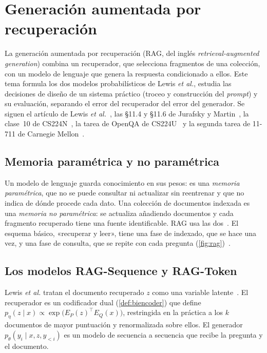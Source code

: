 \chapter{Generación aumentada por recuperación}
\label{tema:5}

La generación aumentada por recuperación (RAG, del inglés \emph{retrieval-augmented generation}) combina un recuperador, que selecciona fragmentos de una colección, con un modelo de lenguaje que genera la respuesta condicionado a ellos. Este tema formula los dos modelos probabilísticos de Lewis \emph{et al.}, estudia las decisiones de diseño de un sistema práctico (troceo y construcción del \emph{prompt}) y su evaluación, separando el error del recuperador del error del generador. Se siguen el artículo de Lewis \emph{et al.}~\cite{rag}, las §11.4 y §11.6 de Jurafsky y Martin~\cite{jm3}, la clase~10 de CS224N~\cite{cs224n}, la tarea de OpenQA de CS224U~\cite{cs224u} y la segunda tarea de 11-711 de Carnegie Mellon~\cite{cmu711}.

\section{Memoria paramétrica y no paramétrica}

Un modelo de lenguaje guarda conocimiento en sus pesos: es una \emph{memoria paramétrica}, que no se puede consultar ni actualizar sin reentrenar y que no indica de dónde procede cada dato. Una colección de documentos indexada es una \emph{memoria no paramétrica}: se actualiza añadiendo documentos y cada fragmento recuperado tiene una fuente identificable. RAG usa las dos~\cite{rag}. El esquema básico, «recuperar y leer», tiene una fase de indexado, que se hace una vez, y una fase de consulta, que se repite con cada pregunta (\cref{fig:rag})~\cite[§11.4]{jm3}.

\addtocounter{figure}{1}%

\section{Los modelos RAG-Sequence y RAG-Token}

Lewis \emph{et al.} tratan el documento recuperado $z$ como una variable latente~\cite[§2.1]{rag}. El recuperador es un codificador dual (\cref{def:biencoder}) que define $p_\eta(z\mid x)\propto\exp\bigl(E_P(z)^{\top}E_Q(x)\bigr)$, restringida en la práctica a los $k$ documentos de mayor puntuación y renormalizada sobre ellos. El generador $p_\theta(y_i\mid x,z,y_{<i})$ es un modelo de secuencia a secuencia que recibe la pregunta y el documento.

